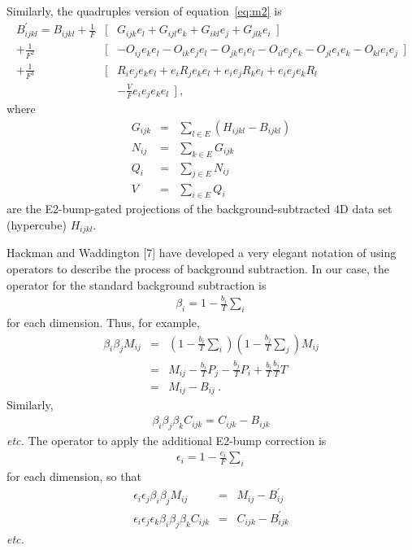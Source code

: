 Similarly, the quadruples version of equation~\ref{eq:m2} is
\begin{eqnarray}
B^{\prime}_{ijkl} = B_{ijkl}
+ \frac {1} {F} 
 & [ & G_{ijk}e_l + G_{ijl}e_k + G_{ikl}e_j + G_{jlk}e_i \ \ ]  \nonumber \\
+ \frac {1} {F^2} 
 & [ & - O_{ij} e_k e_l - O_{ik} e_j e_l - O_{jk} e_i e_l
       - O_{il} e_j e_k - O_{jl} e_i e_k - O_{kl} e_i e_j \ \ ] \nonumber \\
+ \frac {1} {F^3} 
 & [ & R_i e_j e_k e_l + e_i R_j e_k e_l +
       e_i e_j R_k e_l + e_i e_j e_k R_l                        \nonumber \\
 &   & - \frac {V}{F} e_i e_j e_k e_l \ \ ] \ ,                 \label{eq:m2q}
\end{eqnarray}
where
\begin{eqnarray*}
G_{ijk} & = & \sum_{l \in E} (H_{ijkl} - B_{ijkl}) \\
N_{ij}  & = & \sum_{k \in E} G_{ijk} \\
Q_i     & = & \sum_{j \in E} N_{ij} \\
V       & = & \sum_{i \in E} Q_i
\end{eqnarray*}
are the E2-bump-gated projections of the background-subtracted 4D data set
(hypercube) $H_{ijkl}$.

Hackman and Waddington [7] have developed a very elegant notation of using
operators to describe the process of background subtraction. In our case, the
operator for the standard background subtraction is
\begin{eqnarray*}
\beta_i = 1 - \frac {b_i}{T} \sum_i
\end{eqnarray*}
for each dimension. Thus, for example,
\begin{eqnarray*}
\beta_i \beta_j M_{ij}
& = & (1 - \frac {b_i}{T} \sum_i)(1 - \frac {b_j}{T} \sum_j) M_{ij} \\
& = & M_{ij} - \frac {b_i}{T} P_j - \frac {b_j}{T} P_i
             + \frac {b_i}{T} \frac {b_j}{T} T \\
& = & M_{ij} - B_{ij} \ .
\end{eqnarray*}
Similarly,
\begin{eqnarray*}
\beta_i \beta_j \beta_k C_{ijk} = C_{ijk} - B_{ijk}
\end{eqnarray*}
{\em etc.} The operator to apply the additional E2-bump correction is
\begin{eqnarray*}
\epsilon_i = 1 - \frac {e_i}{F} \sum_i
\end{eqnarray*}
for each dimension, so that
\begin{eqnarray*}
\epsilon_i \epsilon_j \beta_i \beta_j M_{ij} & = & M_{ij} - B^{\prime}_{ij} \\
\epsilon_i \epsilon_j \epsilon_k \beta_i \beta_j \beta_k C_{ijk}
& = & C_{ijk} - B^{\prime}_{ijk}
\end{eqnarray*}
{\em etc.}

